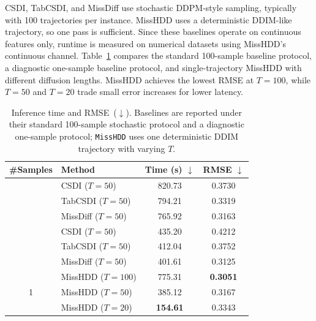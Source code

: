 \documentclass[times, review, 10pt]{elsarticle}
\newcommand{\DIFaddbegin}{\begingroup\color{blue}}
\newcommand{\DIFaddend}{\endgroup}
\begin{document}
\DIFaddbegin
CSDI, TabCSDI, and MissDiff use stochastic DDPM-style sampling, typically with
100 trajectories per instance. MissHDD uses a deterministic DDIM-like
trajectory, so one pass is sufficient. Since these baselines operate on
continuous features only, runtime is measured on numerical datasets using
MissHDD's continuous channel. Table~\ref{tab:inference_summary} compares the
standard 100-sample baseline protocol, a diagnostic one-sample baseline
protocol, and single-trajectory MissHDD with different diffusion lengths.
MissHDD achieves the lowest RMSE at $T{=}100$, while $T{=}50$ and $T{=}20$
trade small error increases for lower latency.
\DIFaddend
\begin{table}[!t]
\centering
\caption{
\DIFaddbegin
Inference time and RMSE~($\downarrow$). Baselines are reported under their
standard 100-sample stochastic protocol and a diagnostic one-sample protocol;
\texttt{MissHDD} uses one deterministic DDIM trajectory with varying $T$.
\DIFaddend
}
\label{tab:inference_summary}
\begin{tabular}{c|l|c|c}
\hline
\DIFaddbegin
\textbf{\#Samples} & \textbf{Method}
\DIFaddend
& \textbf{Time (s) $\downarrow$}
& \textbf{RMSE $\downarrow$} \\
\hline
\DIFaddbegin
\multirow{3}{*}{100}
& CSDI ($T{=}50$)      & 820.73 & 0.3730 \\
& TabCSDI ($T{=}50$)   & 794.21 & 0.3319 \\
& MissDiff ($T{=}50$)  & 765.92 & 0.3163 \\
\DIFaddend
\hline
\DIFaddbegin
\multirow{3}{*}{1}
& CSDI ($T{=}50$)      & 435.20 & 0.4212 \\
& TabCSDI ($T{=}50$)   & 412.04 & 0.3752 \\
& MissDiff ($T{=}50$)  & 401.61 & 0.3125 \\
\hline
\multirow{3}{*}{1}
\DIFaddend
& MissHDD ($T{=}100$) & 775.31 & \textbf{0.3051} \\
& MissHDD ($T{=}50$)  & 385.12 & 0.3167 \\
& MissHDD ($T{=}20$)  & \textbf{154.61} & 0.3343 \\
\hline
\end{tabular}
\end{table}
\end{document}
